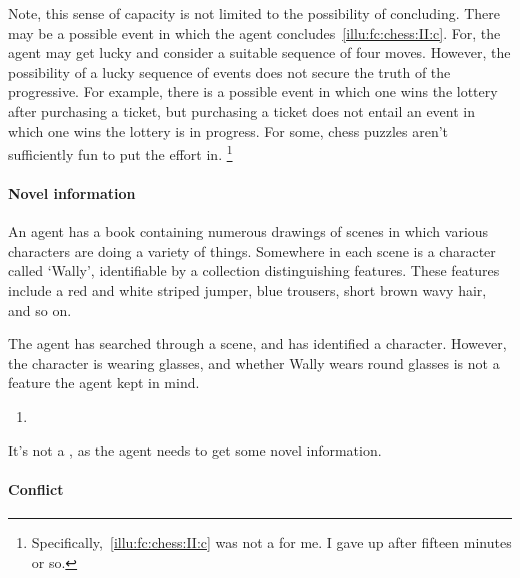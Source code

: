 \begin{note}[Chess II]
  Note, this sense of capacity is not limited to the possibility of concluding.
  There may be a possible event in which the agent concludes~\ref{illu:fc:chess:II:c}.
  For, the agent may get lucky and consider a suitable sequence of four moves.
  However, the possibility of a lucky sequence of events does not secure the truth of the progressive.
  For example, there is a possible event in which one wins the lottery after purchasing a ticket, but purchasing a ticket does not entail an event in which one wins the lottery is in progress.
  For some, chess puzzles aren't sufficiently fun to put the effort in.%
  \footnote{
    Specifically,~\ref{illu:fc:chess:II:c} was not a \fc{} for me.
    I gave up after fifteen minutes or so.
  }
\end{note}

\paragraph*{Novel information}

\begin{note}
  \begin{scenario}
    \label{illu:fc:wally}
    An agent has a book containing numerous drawings of scenes in which various characters are doing a variety of things.
    Somewhere in each scene is a character called `Wally', identifiable by a collection distinguishing features.
    These features include a red and white striped jumper, blue trousers, short brown wavy hair, and so on.

    The agent has searched through a scene, and has identified a character.
    However, the character is wearing glasses, and whether Wally wears round glasses is not a feature the agent kept in mind.
  \end{scenario}

  \begin{enumerate}[label=C\thescenarioCounter., ref=(C\thescenarioCounter)]
  \item
    \label{illu:fc:wally:c}
  \end{enumerate}

  It's not a \fc{}, as the agent needs to get some novel information.
\end{note}

\paragraph*{Conflict}

